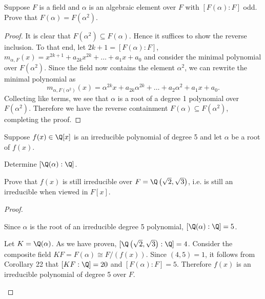 \documentclass[10pt]{amsart}
\begin{document}
\begin{thm}
  \label{Ex5}
  Suppose $F$ is a field and $\alpha$ is an algebraic element over $F$ with $[F(\alpha):F]$ odd.
  Prove that $F(\alpha) = F(\alpha^2)$.
  
  \begin{proof}
    It is clear that $F(\alpha^2) \subseteq F(\alpha)$.  
    Hence it suffices to show the reverse inclusion.
    To that end, let $2k+1 = [F(\alpha):F]$, $m_{\alpha,F}(x) = x^{2k+1} + a_{2k}x^{2k} + \ldots + a_1x + a_0$ and consider the minimal polynomial over $F(\alpha^2)$. 
    Since the field now contains the element $\alpha^2$, we can rewrite the minimal polynomial as
    $$m_{\alpha,F(\alpha^2)}(x) = \alpha^{2k}x + a_{2k}\alpha^{2k} + \ldots + a_2\alpha^2 + a_1x + a_0.$$
    Collecting like terms, we see that $\alpha$ is a root of a degree 1 polynomial over $F(\alpha^2)$.
    Therefore we have the reverse containment $F(\alpha) \subseteq F(\alpha^2)$, completing the proof.
  \end{proof}
\end{thm}

\begin{thm}
  \label{Ex6}
  Suppose $f(x) \in \Q[x]$ is an irreducible polynomial of degree 5 and let $\alpha$ be a root of $f(x)$.
  \begin{alphaenum}
    \item
      Determine $[\Q(\alpha):\Q]$.
    \item
      Prove that $f(x)$ is still irreducible over $F = \Q\left(\sqrt{2},\sqrt{3}\right)$, i.e. is still an irreducible when viewed in $F[x]$.
  \end{alphaenum}
  
  \begin{proof}
    \begin{alphaenum}
    \item
      Since $\alpha$ is the root of an irreducible degree 5 polynomial, $[\Q(\alpha): \Q] = 5$.
    \item
      Let $K = \Q(\alpha)$.
      As we have proven, $[\Q\left(\sqrt{2},\sqrt{3}\right):\Q] = 4$.
      Consider the composite field $KF = F(\alpha) \cong F/(f(x))$.
      Since $(4,5) = 1$, it follows from Corollary 22 that $[KF:\Q] = 20$ and $[F(\alpha):F] = 5$.
      Therefore $f(x)$ is an irreducible polynomial of degree 5 over $F$.
    \end{alphaenum}
  \end{proof}
\end{thm}
\end{document}
